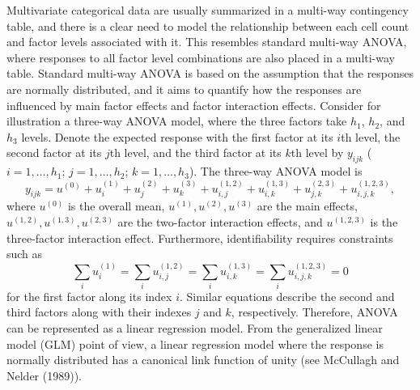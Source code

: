 Multivariate categorical data are usually summarized in a multi-way contingency
table, and there is a clear need to model the relationship between each cell count
and factor levels associated with it. This resembles standard multi-way ANOVA, where
responses to all factor level combinations are also placed in a multi-way table.
Standard multi-way ANOVA is based on the assumption that the responses are normally
distributed, and it aims to quantify how the responses are influenced by main factor
effects and factor interaction effects. Consider for illustration a three-way ANOVA
model, where the three factors take $h_1$, $h_2$, and $h_3$ levels. Denote the
expected response with the first factor at its $i$th level, the second factor at its
$j$th level, and the third factor at its $k$th level by $y_{ijk}$ ($i=1,\ldots,h_1$;
$j=1,\ldots,h_2$; $k=1,\ldots,h_3$). The three-way ANOVA model is
\[
y_{ijk}=u^{(0)}+u^{(1)}_i+u^{(2)}_j+u^{(3)}_k
+u^{(1,2)}_{i,j}+u^{(1,3)}_{i,k}+u^{(2,3)}_{j,k}+u^{(1,2,3)}_{i,j,k},
\]
where $u^{(0)}$ is the overall mean, $u^{(1)}, u^{(2)}, u^{(3)}$ are the main
effects, $u^{(1,2)}, u^{(1,3)}, u^{(2,3)}$ are the two-factor interaction effects,
and $u^{(1,2,3)}$ is the three-factor interaction effect. Furthermore,
identifiability requires constraints such as
\[
\sum_i u^{(1)}_i=\sum_i u^{(1,2)}_{i,j}=\sum_i u^{(1,3)}_{i,k}=\sum_i
u^{(1,2,3)}_{i,j,k}=0
\]
for the first factor along its index $i$. Similar equations describe the second and
third factors along with their indexes $j$ and $k$, respectively. Therefore, ANOVA
can be represented as a linear regression model. From the generalized linear model
(GLM) point of view, a linear regression model where the response is normally
distributed has a canonical link function of unity (see McCullagh and Nelder
(1989)).

